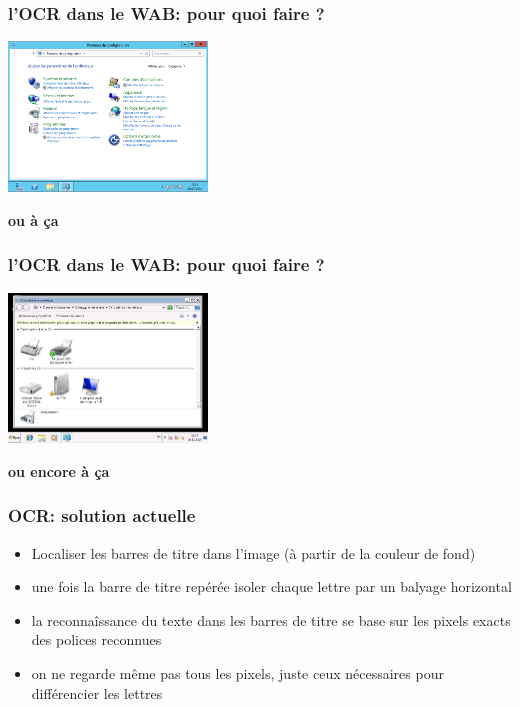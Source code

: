 \documentclass[xcolor=dvipsnames]{beamer}
\begin{document}
\begin{frame}
\frametitle{l'OCR dans le WAB: pour quoi faire ?}
    \begin{center}
       \includegraphics[width=200px]{TBar1.png}
      \begin{alertblock}{}
            \begin{center}
                  \textbf{\Large ou à ça}
            \end{center}
      \end{alertblock}
    \end{center}
\end{frame}

\begin{frame}
\frametitle{l'OCR dans le WAB: pour quoi faire ?}
    \begin{center}
       \includegraphics[width=200px]{TBar3.png}
      \begin{alertblock}{}
            \begin{center}
                  \textbf{\Large ou encore à ça}
            \end{center}
      \end{alertblock}
    \end{center}
\end{frame}

\begin{frame}
\frametitle{OCR: solution actuelle}
    \begin{itemize}
    \item Localiser les barres de titre dans l'image (à partir de la couleur de fond)
    \item une fois la barre de titre repérée isoler chaque lettre par un balyage horizontal
    \item la reconnaîssance du texte dans les barres de titre se base sur les pixels exacts des polices reconnues
    \item on ne regarde même pas tous les pixels, juste ceux nécessaires pour différencier les lettres
    \end{itemize}
\end{frame}
\end{document}
